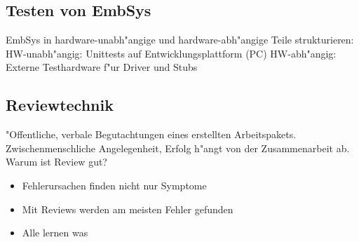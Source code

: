 \subsection{Testen von EmbSys}
EmbSys in hardware-unabh"angige und hardware-abh"angige Teile strukturieren:\\
HW-unabh"angig: Unittests auf Entwicklungsplattform (PC)
HW-abh"angig: Externe Testhardware f"ur Driver und Stubs

\subsection{Reviewtechnik}
"Offentliche, verbale Begutachtungen eines erstellten Arbeitspakets. Zwischenmenschliche Angelegenheit, Erfolg h"angt von der Zusammenarbeit ab.
Warum ist Review gut? 
\begin{itemize}
\item Fehlerursachen finden nicht nur Symptome
\item Mit Reviews werden am meisten Fehler gefunden
\item Alle lernen was
\end{itemize}